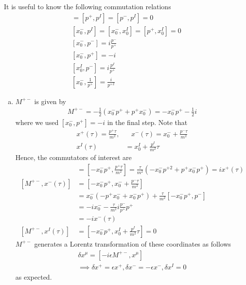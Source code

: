 \documentclass[11pt]{article}
\begin{document}
It is useful to know the following commutation relations 
\begin{align*}
    [p^-, p^+] = [p^+, p^I] = [p^-, p^I] = 0 \\
    [x_0^-, p^I] = [x_0^-, x_0^I] = [p^+, x_0^I] = 0 \\
    [x_0^-, p^-] = i \frac{p^-}{p^+} \\
    [x_0^-, p^+] = -i \\
    [x_0^I, p^-] = i \frac{p^I}{p^+} \\
    [x_0^-, \frac{1}{p^+}] = \frac{i}{p^{+2}}
\end{align*}
\begin{enumerate}[(a)]
    \item $M^{+-}$ is given by 
    \begin{align*}
        M^{+-} = - \frac{1}{2}(x_0^- p^+ + p^+ x_0^-) = -x_0^- p^+ - \frac{1}{2}i 
    \end{align*}
    where we used $[x_0^-, p^+] = -i$ in the final step. Note that 
    \begin{align*}
        x^+ (\tau) = \frac{p^+ \tau }{m^2}, &~~~~ x^-(\tau) = x_0^- + \frac{p^- \tau }{m^2} \tag{Zwiebach's 11.63} \\
        x^I(\tau) &= x_0^I + \frac{p^I}{m^2}\tau \tag{Zwiebach's 11.15}
    \end{align*}
    Hence, the commutators of interest are 
    \begin{align*}
        [M^{+-}, x^+(\tau)] &= [-x_0^- p^+, \frac{p^+ \tau }{m^2}] = \frac{\tau }{m^2} (-x_0^- p^{+2} + p^+ x_0^- p^+) = i x^+(\tau) \\
        [M^{+-}, x^-(\tau)] &= [-x_0^- p^+, x_0^- + \frac{p^- \tau }{m^2}] \\
        &= x_0^-(-p^+ x_0^- + x_0^- p^+) +  \frac{\tau }{m^2} [-x_0^- p^+, p^-] \\
        &= -i x_0^- - \frac{\tau }{m^2} i \frac{p^-}{p^+} p^+ \\
        &= -i x^-(\tau) \\
        [M^{+-}, x^I(\tau)] &= [-x_0^- p^+, x^I_0 + \frac{p^I}{m^2}\tau ] =0 
    \end{align*}
    $M^{+-}$ generates a Lorentz transformation of these coordinates as follows 
    \begin{align*}
        \delta x^\mu = [-i\epsilon M^{+-}, x^\mu] \\
        \implies \delta x^+ = \epsilon x^+, \delta x^- = -\epsilon x^-, \delta x^I = 0 
    \end{align*}
    as expected.  


\end{enumerate}
\end{document}
